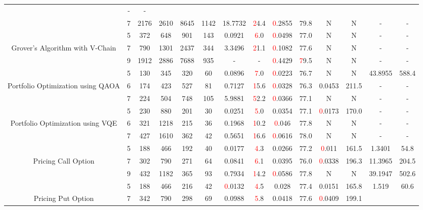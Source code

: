 \begin{table}[htb]
{\begin{tabular}{|c|c|c|c|c|c|c|c|c|c|c|c|c|c|}
 & - & -
 \\
 & 
7 & 2176 & 2610 & 8645 & 1142
 & 18.7732 & \textcolor{red}24.4
 & \textcolor{red}0.2855 & 79.8
 & N & N 
 & - & -
 \\
\hline
 & 
5 & 372 & 648 & 901 & 143
 & 0.0921 & \textcolor{red}6.0
 & \textcolor{red}0.0498 & 77.0
 & N & N 
 & - & -
 \\
Grover's Algorithm with V-Chain & 
7 & 790 & 1301 & 2437 & 344
 & 3.3496 & \textcolor{red}21.1
 & \textcolor{red}0.1082 & 77.6
 & N & N 
 & - & -
 \\
 & 
9 & 1912 & 2886 & 7688 & 935
 & - & -
 & \textcolor{red}0.4429 & \textcolor{red}79.5
 & N & N 
 & - & -
 \\
\hline
 & 
5 & 130 & 345 & 320 & 60
 & 0.0896 & \textcolor{red}7.0
 & \textcolor{red}0.0223 & 76.7
 & N & N 
 & 43.8955 & 588.4
 \\
Portfolio Optimization using QAOA & 
6 & 174 & 423 & 527 & 81
 & 0.7127 & \textcolor{red}15.6
 & \textcolor{red}0.0328 & 76.3
 & 0.0453 & 211.5
 & - & -
 \\
 & 
7 & 224 & 504 & 748 & 105
 & 5.9881 & \textcolor{red}52.2
 & \textcolor{red}0.0366 & 77.1
 & N & N 
 & - & -
 \\
\hline
 & 
5 & 230 & 880 & 201 & 30
 & 0.0251 & \textcolor{red}5.0
 & 0.0354 & 77.1
 & \textcolor{red}0.0173 & 170.0
 & - & -
 \\
Portfolio Optimization using VQE & 
6 & 321 & 1218 & 215 & 36
 & 0.1968 & \textcolor{red}10.2
 & \textcolor{red}0.046 & 77.8
 & N & N 
 & - & -
 \\
 & 
7 & 427 & 1610 & 362 & 42
 & 0.5651 & \textcolor{red}16.6
 & \textcolor{red}0.0616 & 78.0
 & N & N 
 & - & -
 \\
\hline
 & 
5 & 188 & 466 & 192 & 40
 & 0.0177 & \textcolor{red}4.3
 & 0.0266 & 77.2
 & \textcolor{red}0.011 & 161.5
 & 1.3401 & 54.8
 \\
Pricing Call Option & 
7 & 302 & 790 & 271 & 64
 & 0.0841 & \textcolor{red}6.1
 & 0.0395 & 76.0
 & \textcolor{red}0.0338 & 196.3
 & 11.3965 & 204.5
 \\
 & 
9 & 432 & 1182 & 365 & 93
 & 0.7934 & \textcolor{red}14.2
 & \textcolor{red}0.0586 & 77.8
 & N & N 
 & 39.1947 & 502.6
 \\
\hline
 & 
5 & 188 & 466 & 216 & 42
 & \textcolor{red}0.0132 & \textcolor{red}4.5
 & 0.028 & 77.4
 & 0.0151 & 165.8
 & 1.519 & 60.6
 \\
Pricing Put Option & 
7 & 342 & 790 & 298 & 69
 & 0.0988 & \textcolor{red}5.8
 & 0.0418 & 77.6
 & \textcolor{red}0.0409 & 199.1

\end{tabular}}
\end{table}
